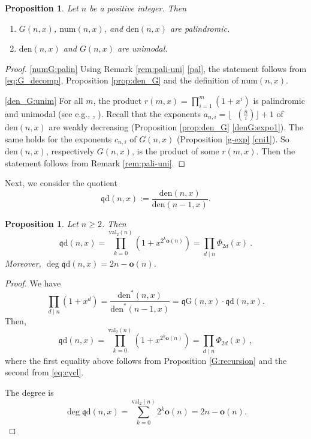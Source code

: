 \documentclass[reqno]{amsart}
\def\den{\mathrm{den}}
\def\num{\mathrm{num}}
\def\val{\mathrm{val}}
\def\rg{\mathrm{\mathfrak q G}}
\def\rd{\mathrm{\mathfrak q d}}
\def\o{\mathbf o}
\DeclareMathOperator{\lb}{\log_2}
\newtheorem{proposition}[theorem]{Proposition}
\theoremstyle{definition}
\begin{document}
\begin{proposition} \label{prop:ord_p_u} Let $n$ be a positive integer. Then 
\begin{enumerate}[label=(\alph*)]
\item \label{numG:palin}   $G(n,x)$, $\num(n,x)$, and $\den(n,x)$ are palindromic. 
 \item \label{den_G:unim} $\den(n,x)$ and $G(n,x)$ are  unimodal.
    \end{enumerate}
\end{proposition}
\begin{proof}

\ref{numG:palin}
 Using Remark \ref{rem:pali-uni} \ref{pal},  the statement follows from \eqref{eq:G_decomp}, Proposition \ref{prop:den_G} and the definition of $\num(n,x)$.

  

\ref{den_G:unim}      For all $m$, the product $r(m,x)=\prod_{i=1}^m(1+x^i)$ is palindromic and  unimodal (see e.g., \cite{Dyn1950}, \cite{StZa15}).  
Recall that the exponents $a_{n,i}=\lfloor\lb(\frac{n}{i})\rfloor+1$ of $\den(n,x)$ are weakly decreasing (Proposition \ref{prop:den_G} \ref{denG:expo1}). The same holds  for the exponents $c_{n,i}$ of $G(n,x)$ (Proposition \ref{g-exp} \ref{cni1}).
So $\den(n,x)$, respectively $G(n,x)$, is the product of some $r(m,x)$.  Then the statement follows from Remark \ref{rem:pali-uni}.
\end{proof}

Next, we consider the quotient $$\rd(n,x):=\frac{\den(n,x)}{\den(n-1,x)}.$$

\begin{proposition}\label{eq:qd} Let $n\geq 2$. Then 
\begin{equation*}\rd(n,x)=\prod_{k=0}^{\val_2(n)}(1+x^{2^k\o(n)})=\prod_{d \mid n}{\Phi_{2d}(x)}\:.\end{equation*}
Moreover, $\deg\rd(n,x)=2n-\o(n)$.    
\end{proposition}
\begin{proof} 
We have $$\prod_{d\mid n}(1+x^d)=\frac{\den^\ast(n,x)}{\den^\ast(n-1,x)}=\rg(n,x)\cdot\rd(n,x).$$
Then, 
\[\rd(n,x)=\prod_{k=0}^{\val_2(n)}(1+x^{2^k\o(n)})= \prod_{d \mid n}{\Phi_{2d}(x)}\:,\] where the first equality above follows from Proposition \ref{G:recursion} and the second from 
\eqref{eq:cycl}. 



The degree is
\[\deg\rd(n,x)=\sum_{k=0}^{\val_2(n)}2^k\o(n)=2n-\o(n).\]    
\end{proof}
\end{document}
